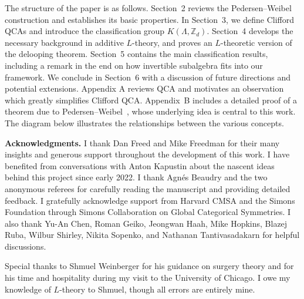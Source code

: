 \documentclass{article}
\theoremstyle{definition}
\begin{document}
The structure of the paper is as follows. Section~2 reviews the Pedersen–Weibel construction and establishes its basic properties. In Section~3, we define Clifford QCAs and introduce the classification group \(K(\Lambda, \mathbb{Z}_d)\). Section~4 develops the necessary background in additive \(L\)-theory, and proves an \(L\)-theoretic version of the delooping theorem. Section~5 contains the main classification results, including a remark in the end on how invertible subalgebra fits into our framework. We conclude in Section~6 with a discussion of future directions and potential extensions. Appendix A reviews QCA and motivates an observation which greatly simplifies Clifford QCA. Appendix~B includes a detailed proof of a theorem due to Pedersen--Weibel~\cite{pedersen2006nonconnective}, whose underlying idea is central to this work.
The diagram below illustrates the relationships between the various concepts.



\medskip

\noindent\textbf{Acknowledgments.} 
I thank Dan Freed and Mike Freedman for their many insights and generous support throughout the development of this work. I have benefited from conversations with Anton Kapustin about the nascent ideas behind this project since early 2022. I thank Agn\'es Beaudry and the two anonymous referees for carefully reading the manuscript and providing detailed feedback. I gratefully acknowledge support from Harvard CMSA and the Simons Foundation through Simons
Collaboration on Global Categorical Symmetries. I also thank Yu-An Chen, Roman Geiko, Jeongwan Haah, Mike Hopkins, Blazej Ruba, Wilbur Shirley, Nikita Sopenko, and Nathanan Tantivasadakarn for helpful discussions. 

Special thanks to Shmuel Weinberger for his guidance on surgery theory and for his time and hospitality during my visit to the University of Chicago. I owe my knowledge of
$L$-theory to Shmuel, though all errors are entirely mine. 
\end{document}
